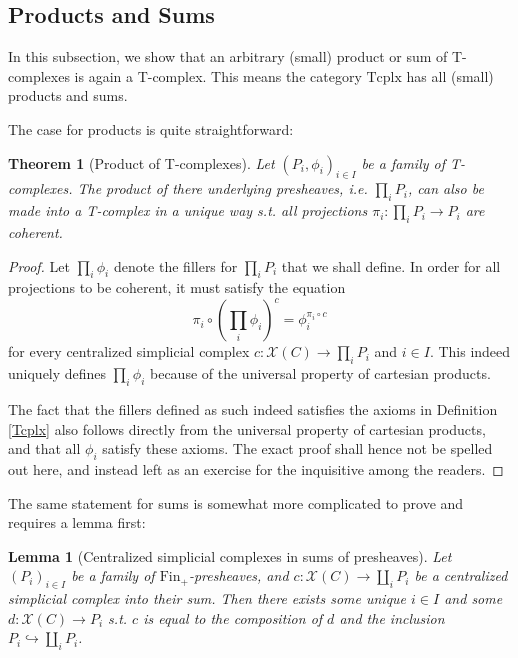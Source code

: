 \documentclass{article}
\newtheorem{theorem}{Theorem}[subsection]
\newtheorem{lemma}{Lemma}[subsection]
\theoremstyle{remark}
\theoremstyle{definition}
\newcommand{\Fin}{\mathrm{Fin}}
\newcommand{\X}{\mathcal X}
\newcommand{\Tcplx}{\mathrm{Tcplx}}
\begin{document}
	\subsection{Products and Sums}
	In this subsection, we show that an arbitrary (small) product or sum of T-complexes is again a T-complex. This means the category $\Tcplx$ has all (small) products and sums.
	
	The case for products is quite straightforward:
	\begin{theorem}[Product of T-complexes]
		Let $(P_i,\phi_i)_{i\in I}$ be a family of T-complexes. The product of there underlying presheaves, i.e. $\prod_iP_i$, can also be made into a T-complex in a unique way s.t. all projections $\pi_i:\prod_iP_i\to P_i$ are coherent.
	\end{theorem}
	\begin{proof}
		Let $\prod_i\phi_i$ denote the fillers for $\prod_iP_i$ that we shall define. In order for all projections to be coherent, it must satisfy the equation
		\begin{equation}\label{prodfill}
			\pi_i\circ\left(\prod_i\phi_i\right)^c=\phi_i^{\pi_i\circ c}
		\end{equation}
		for every centralized simplicial complex $c:\X(C)\to\prod_iP_i$ and $i\in I$. This indeed uniquely defines $\prod_i\phi_i$ because of the universal property of cartesian products.
		
		The fact that the fillers defined as such indeed satisfies the axioms in Definition \ref{Tcplx} also follows directly from the universal property of cartesian products, and that all $\phi_i$ satisfy these axioms. The exact proof shall hence not be spelled out here, and instead left as an exercise for the inquisitive among the readers.
	\end{proof}
	The same statement for sums is somewhat more complicated to prove and requires a lemma first:
	\begin{lemma}[Centralized simplicial complexes in sums of presheaves]\label{cscsum}
		Let $(P_i)_{i\in I}$ be a family of $\Fin_+$-presheaves, and $c:\X(C)\to\coprod_iP_i$ be a centralized simplicial complex into their sum. Then there exists some unique $i\in I$ and some $d:\X(C)\to P_i$ s.t. $c$ is equal to the composition of $d$ and the inclusion $P_i\hookrightarrow\coprod_iP_i$.
	\end{lemma}
\end{document}
